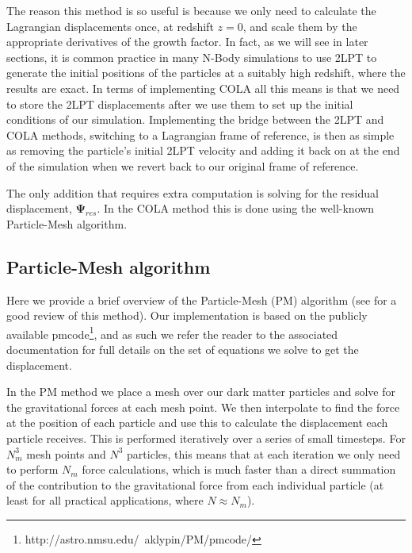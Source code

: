 \documentclass[5p,authoryear]{elsarticle}
\begin{document}
The reason this method is so useful is because we only need to calculate the Lagrangian displacements once, at redshift $z=0$, and scale them by the appropriate derivatives of the growth factor. In fact, as we will see in later sections,  it is common practice in many N-Body simulations to use 2LPT to generate the initial positions of the particles at a suitably high redshift, where the results are exact. In terms of implementing COLA all this means is that we need to store the 2LPT displacements after we use them to set up the initial conditions of our simulation. Implementing the bridge between the 2LPT and COLA methods, switching to a Lagrangian frame of reference, is then as simple as removing the particle's initial 2LPT velocity and  adding it back on at the end of the simulation when we revert back to our original frame of reference.

The only addition that requires extra computation is solving for the residual displacement, $\boldsymbol{\Psi}_{res}$. In the COLA method this is done using the well-known Particle-Mesh algorithm.

\subsection{Particle-Mesh algorithm}

Here we provide a brief overview of the Particle-Mesh (PM) algorithm (see \cite{Hockney1982} for a good review of this method). Our implementation is based on the publicly available {\sc pmcode}\footnote{http://astro.nmsu.edu/~aklypin/PM/pmcode/}, and as such we refer the reader to the associated documentation for full details on the set of equations we solve to get the displacement. 

In the PM method we place a mesh over our dark matter particles and solve for the gravitational forces at each mesh point. We then interpolate to find the force at the position of each particle and use this to calculate the displacement each particle receives. This is performed iteratively over a series of small timesteps. For $N_{m}^{3}$ mesh points and $N^{3}$ particles, this means that at each iteration we only need to perform $N_{m}$ force calculations, which is much faster than a direct summation of the contribution to the gravitational force from each individual particle (at least for all practical applications, where $N \approx N_{m}$). 
\end{document}
